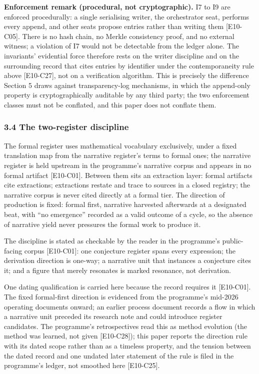 \documentclass[
  11pt,
]{article}
\begin{document}
\textbf{Enforcement remark (procedural, not cryptographic).} I7 to I9
are enforced procedurally: a single serialising writer, the orchestrator
seat, performs every append, and other seats propose entries rather than
writing them {[}E10-C05{]}. There is no hash chain, no Merkle
consistency proof, and no external witness; a violation of I7 would not
be detectable from the ledger alone. The invariants' evidential force
therefore rests on the writer discipline and on the surrounding record
that cites entries by identifier under the contemporaneity rule above
{[}E10-C27{]}, not on a verification algorithm. This is precisely the
difference Section 5 draws against transparency-log mechanisms, in which
the append-only property is cryptographically auditable by any third
party; the two enforcement classes must not be conflated, and this paper
does not conflate them.

\subsubsection{3.4 The two-register
discipline}\label{the-two-register-discipline}

The formal register uses mathematical vocabulary exclusively, under a
fixed translation map from the narrative register's terms to formal
ones; the narrative register is held upstream in the programme's
narrative corpus and appears in no formal artifact {[}E10-C01{]}.
Between them sits an extraction layer: formal artifacts cite
extractions; extractions restate and trace to sources in a closed
registry; the narrative corpus is never cited directly at a formal tier.
The direction of production is fixed: formal first, narrative harvested
afterwards at a designated beat, with ``no emergence'' recorded as a
valid outcome of a cycle, so the absence of narrative yield never
pressures the formal work to produce it.

The discipline is stated as checkable by the reader in the programme's
public-facing corpus {[}E10-C01{]}: one conjecture register spans every
expression; the derivation direction is one-way; a narrative unit that
instances a conjecture cites it; and a figure that merely resonates is
marked resonance, not derivation.

One dating qualification is carried here because the record requires it
{[}E10-C01{]}. The fixed formal-first direction is evidenced from the
programme's mid-2026 operating documents onward; an earlier process
document records a flow in which a narrative unit preceded its research
note and could introduce register candidates. The programme's
retrospectives read this as method evolution (the method was learned,
not given {[}E10-C28{]}); this paper reports the direction rule with its
dated scope rather than as a timeless property, and the tension between
the dated record and one undated later statement of the rule is filed in
the programme's ledger, not smoothed here {[}E10-C25{]}.
\end{document}
